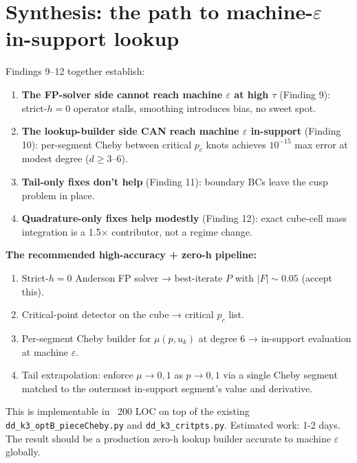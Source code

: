 \documentclass[11pt]{article}
\begin{document}
\section{Synthesis: the path to machine-$\varepsilon$ in-support lookup}

Findings 9--12 together establish:

\begin{enumerate}\itemsep1pt
  \item \textbf{The FP-solver side cannot reach machine $\varepsilon$ at
        high $\tau$} (Finding 9): strict-$h{=}0$ operator stalls,
        smoothing introduces bias, no sweet spot.
  \item \textbf{The lookup-builder side CAN reach machine $\varepsilon$
        in-support} (Finding 10): per-segment Cheby between
        critical $p_c$ knots achieves $10^{-15}$ max error at
        modest degree ($d \ge 3$--$6$).
  \item \textbf{Tail-only fixes don't help} (Finding 11): boundary BCs
        leave the cusp problem in place.
  \item \textbf{Quadrature-only fixes help modestly} (Finding 12):
        exact cube-cell mass integration is a 1.5$\times$ contributor,
        not a regime change.
\end{enumerate}

\textbf{The recommended high-accuracy + zero-h pipeline:}
\begin{enumerate}\itemsep1pt
  \item Strict-$h{=}0$ Anderson FP solver → best-iterate $P$ with
        $|F| \sim 0.05$ (accept this).
  \item Critical-point detector on the cube → critical $p_c$ list.
  \item Per-segment Cheby builder for $\mu(p, u_k)$ at degree 6 →
        in-support evaluation at machine $\varepsilon$.
  \item Tail extrapolation: enforce $\mu \to 0, 1$ as $p \to 0, 1$
        via a single Cheby segment matched to the outermost
        in-support segment's value and derivative.
\end{enumerate}

This is implementable in ~200 LOC on top of the existing
\texttt{dd\_k3\_optB\_pieceCheby.py} and \texttt{dd\_k3\_critpts.py}.
Estimated work: 1-2 days. The result should be a production zero-h
lookup builder accurate to machine $\varepsilon$ globally.
\end{document}
